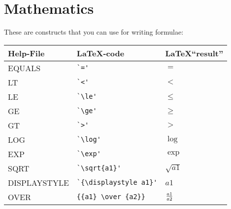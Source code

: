 \documentclass[a4paper,11pt]{article}
\begin{document}
\bigskip
\pagebreak[4]%

\section{Mathematics}
These are constructs that you can use for writing formulae:
%
\begin{center}
\begin{tabular}{l@{\ \ $\to$\ \ }p{12em}@{\ \ $\longrightarrow$\ \ }l}
\hline
Help-File & \LaTeX-code & \LaTeX ``result'' \\
\hline\hline

EQUALS          & \verb#`='#    & $ = $ \\
LT              & \verb#`<'#    & $ < $ \\
LE              & \verb#`\le'#  & $ \le $ \\
GE              & \verb#`\ge'#  & $ \ge $ \\
GT              & \verb#`>'#    & $ > $ \\
LOG             & \verb#`\log'#         & $ \log $ \\
EXP             & \verb#`\exp'#         & $ \exp $ \\
SQRT            & \verb#`\sqrt{a1}'#    & $ \sqrt{a1} $ \\
DISPLAYSTYLE    & \verb#`{\displaystyle a1}'#   & $ {\displaystyle a1} $ \\
OVER            & \verb#{{a1} \over {a2}}#      & $ {{a1} \over {a2}} $ \\

\end{tabular}
\end{center}
\end{document}

